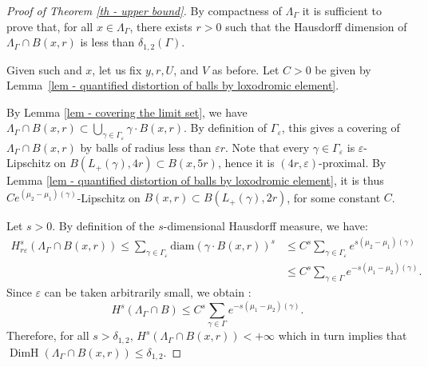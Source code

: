 \documentclass[11pt]{article}
\numberwithin{equation}{section}
\theoremstyle{definition}
\DeclareMathOperator{\DimH}{DimH}
\let\epsilon\varepsilon
\let\G\Gamma
\let\g\gamma
\begin{document}
\begin{proof}[Proof of Theorem \ref{th - upper bound}]
By compactness of $\Lambda_\Gamma$ it is sufficient to prove that, for all $x\in \Lambda_\Gamma$, there exists $r>0$ such that the Hausdorff dimension of $\Lambda_\Gamma \cap B(x,r)$ is less than $ \delta_{1,2}(\G)$.

Given such and $x$, let us fix $y, r, U$, and $V$ as before. Let $C>0$ be given by Lemma~\ref{lem - quantified distortion of balls by loxodromic element}.

By Lemma \ref{lem - covering the limit set}, we have $\Lambda_\Gamma\cap B(x,r) \subset \bigcup_{\g \in \G_\epsilon} \g \cdot B(x,r)$. By definition of $\G_\epsilon$, this gives a covering of $\Lambda_\Gamma\cap B(x,r)$ by balls of radius less than $\epsilon r$.
Note that every $\gamma \in \Gamma_\epsilon$ is $\epsilon$-Lipschitz on $B(L_+(\gamma), 4r) \subset B(x,5r)$, hence it is $(4r,\epsilon)$\nobreakdash-prox\-imal. By Lemma \ref{lem - quantified distortion of balls by loxodromic element}, it is thus $Ce^{(\mu_2-\mu_1)(\gamma)}$-Lipschitz on $B(x,r) \subset B(L_+(\g),2r)$, for some constant $C$.

Let $s>0$. By definition of the $s$-dimensional Hausdorff measure, we have:
\begin{align*}
H^{s}_{r\epsilon} (\Lambda_\Gamma \cap B(x,r))\leq \sum_{\g\in \G_\epsilon} \mathrm{diam}(\g \cdot B(x,r)) ^s
& \leq C^s \sum_{\g\in \G_\epsilon} e^{s(\mu_2- \mu_1)(\g)}\\
&\leq C^s \sum_{\g\in \G} e^{-s(\mu_1- \mu_2) (\g)}.
\end{align*}
Since $\epsilon$ can be taken arbitrarily small, we obtain :
\[H^{s} (\Lambda_\G \cap B)\leq C^s \sum_{\g\in \G} e^{-s(\mu_1- \mu_2) (\g)}.\]
Therefore, for all $s>\delta_{1,2}$,
$H^{s} (\Lambda_\G \cap B(x,r))<+\infty$ which in turn implies that $\DimH(\Lambda_\G\cap B(x,r)) \leq \delta_{1,2}$.
\end{proof}


\end{document}
